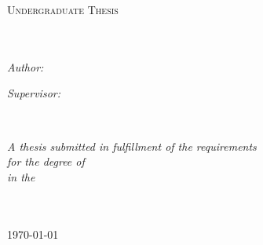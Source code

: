 \documentclass[
11pt, %
english, %
singlespacing, %
headsepline, %
chapterinoneline, %
]{MastersDoctoralThesis} %
\author{Elliott \textsc{Capek}} %
\newcommand{\ttitle}{Thesis title}
\begin{document}
\frontmatter %

\pagestyle{plain} %


\begin{titlepage}
\begin{center}

\vspace*{.06\textheight}
{\scshape\LARGE \univname\par}\vspace{1.5cm} %
\textsc{\Large Undergraduate Thesis}\\[0.5cm] %

\HRule \\[0.4cm] %
\HRule \\[1.5cm] %
 
\begin{minipage}[t]{0.4\textwidth}
\begin{flushleft} \large
\emph{Author:}\\
{\authorname} %
\end{flushleft}
\end{minipage}
\begin{minipage}[t]{0.4\textwidth}
\begin{flushright} \large
\emph{Supervisor:} \\
{\supname} %
\end{flushright}
\end{minipage}\\[3cm]
 
\vfill

\large \textit{A thesis submitted in fulfillment of the requirements\\ for the degree of \degreename}\\[0.3cm] %
\textit{in the}\\[0.4cm]
\groupname\\\deptname\\[2cm] %
 
\vfill

{\large \today}\\[4cm] %
 
\vfill
\end{center}
\end{titlepage}
\end{document}
